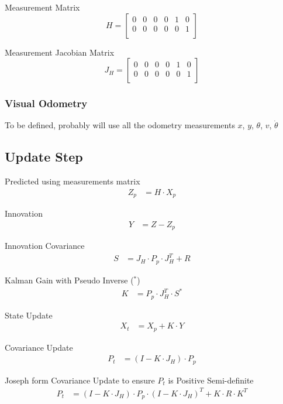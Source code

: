 Measurement Matrix
\begin{equation}
H
=
\begin{bmatrix} 
0 & 0 & 0 & 0 & 1 & 0 \\ 
0 & 0 & 0 & 0 & 0 & 1 \\ 
\end{bmatrix}
\end{equation}

Measurement Jacobian Matrix
\begin{equation}
J_H
=
\begin{bmatrix} 
0 & 0 & 0 & 0 & 1 & 0 \\ 
0 & 0 & 0 & 0 & 0 & 1 \\ 
\end{bmatrix}
\end{equation}

\subsubsection{Visual Odometry}
To be defined, probably will use all the odometry measurements $x$, $y$, $\theta$, $v$, $\dot \theta$

\subsection{Update Step}

Predicted using measurements matrix
\begin{align}
Z_p & = H \cdot X_p
\end{align}

Innovation
\begin{align}
Y & = Z - Z_p
\end{align}

Innovation Covariance
\begin{align}
S & = J_H \cdot P_p \cdot J_H^T + R
\end{align}

Kalman Gain with Pseudo Inverse ($^*$)
\begin{align}
K & = P_p \cdot J_H^T \cdot S^{*} 
\end{align}

State Update
\begin{align}
X_t & = X_p + K \cdot Y
\end{align}

Covariance Update
\begin{align}
P_t & = (I - K \cdot J_H) \cdot P_p
\end{align}

Joseph form Covariance Update to ensure $P_t$ is Positive Semi-definite
\begin{align}
P_t & = (I - K \cdot J_H) \cdot P_p \cdot (I - K \cdot J_H)^T + K \cdot R \cdot K^T
\end{align}

